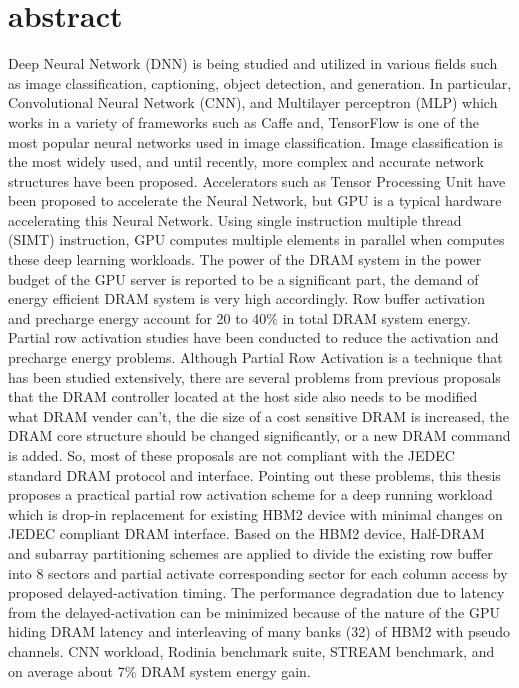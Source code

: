 \section{abstract}
Deep Neural Network (DNN) is being studied and utilized in various fields such as image classification, captioning, object detection, and generation. In particular, Convolutional Neural Network (CNN), and Multilayer perceptron (MLP) which works in a variety of frameworks such as Caffe and, TensorFlow is one of the most popular neural networks used in image classification. Image classification is the most widely used, and until recently, more complex and accurate network structures have been proposed. 
Accelerators such as Tensor Processing Unit have been proposed to accelerate the Neural Network, but GPU is a typical hardware accelerating this Neural Network. Using single instruction multiple thread (SIMT) instruction, GPU computes multiple elements in parallel when computes these deep learning workloads.
The power of the DRAM system in the power budget of the GPU server is reported to be a significant part, the demand of energy efficient DRAM system is very high accordingly. Row buffer activation and precharge energy account for 20 to 40\% in total DRAM system energy. Partial row activation studies have been conducted to reduce the activation and precharge energy problems. 
Although Partial Row Activation is a technique that has been studied extensively, there are several problems from previous proposals that the DRAM controller located at the host side also needs to be modified what DRAM vender can’t, the die size of a cost sensitive DRAM is increased, the DRAM core structure should be changed significantly, or a new DRAM command is added.
So, most of these proposals are not compliant with the JEDEC standard DRAM protocol and interface.
Pointing out these problems, this thesis proposes a practical partial row activation scheme for a deep running workload which is drop-in replacement for existing HBM2 device with minimal changes on JEDEC compliant DRAM interface. Based on the HBM2 device, Half-DRAM and subarray partitioning schemes are applied to divide the existing row buffer into 8 sectors and partial activate corresponding sector for each column access by proposed delayed-activation timing.
The performance degradation due to latency from the delayed-activation can be minimized because of the nature of the GPU hiding DRAM latency and interleaving of many banks (32) of HBM2 with pseudo channels. CNN workload, Rodinia benchmark suite, STREAM benchmark, and on average about 7\% DRAM system energy gain.